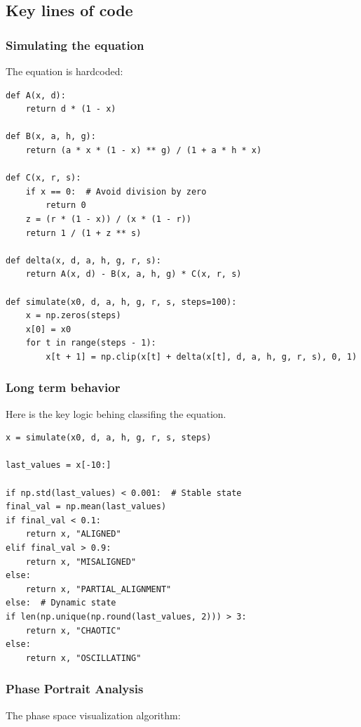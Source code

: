 \documentclass[a4paper, 10pt]{article}
\begin{document}
\subsection{Key lines of code}
\subsubsection{Simulating the equation}
The equation is hardcoded:

\begin{verbatim}
def A(x, d):
    return d * (1 - x)

def B(x, a, h, g):
    return (a * x * (1 - x) ** g) / (1 + a * h * x)

def C(x, r, s):
    if x == 0:  # Avoid division by zero
        return 0
    z = (r * (1 - x)) / (x * (1 - r))
    return 1 / (1 + z ** s)

def delta(x, d, a, h, g, r, s):
    return A(x, d) - B(x, a, h, g) * C(x, r, s)

def simulate(x0, d, a, h, g, r, s, steps=100):
    x = np.zeros(steps)
    x[0] = x0
    for t in range(steps - 1):
        x[t + 1] = np.clip(x[t] + delta(x[t], d, a, h, g, r, s), 0, 1)
\end{verbatim}

\subsubsection{Long term behavior}
Here is the key logic behing classifing the equation.

\begin{verbatim}
x = simulate(x0, d, a, h, g, r, s, steps)

last_values = x[-10:]

if np.std(last_values) < 0.001:  # Stable state
final_val = np.mean(last_values)
if final_val < 0.1:
    return x, "ALIGNED"
elif final_val > 0.9:
    return x, "MISALIGNED"
else:
    return x, "PARTIAL_ALIGNMENT"
else:  # Dynamic state
if len(np.unique(np.round(last_values, 2))) > 3:
    return x, "CHAOTIC"
else:
    return x, "OSCILLATING"
\end{verbatim}

\subsubsection{Phase Portrait Analysis}
The phase space visualization algorithm:
\end{document}
